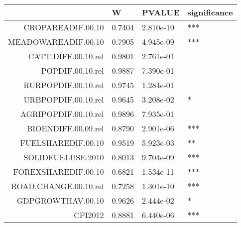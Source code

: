 \begin{table}[ht]
\centering
\begin{tabular}{rlll}
  \hline
 & W & PVALUE & significance \\ 
  \hline
CROPAREADIF.00.10 & 0.7404 & 2.810e-10 & *** \\ 
  MEADOWAREADIF.00.10 & 0.7905 & 4.945e-09 & *** \\ 
  CATT.DIFF.00.10.rel & 0.9801 & 2.761e-01 &   \\ 
  POPDIF.00.10.rel & 0.9887 & 7.390e-01 &   \\ 
  RURPOPDIF.00.10.rel & 0.9745 & 1.284e-01 &   \\ 
  URBPOPDIF.00.10.rel & 0.9645 & 3.208e-02 & * \\ 
  AGRIPOPDIF.00.10.rel & 0.9896 & 7.935e-01 &   \\ 
  BIOENDIFF.00.09.rel & 0.8790 & 2.901e-06 & *** \\ 
  FUELSHAREDIF.00.10 & 0.9519 & 5.923e-03 & ** \\ 
  SOLIDFUELUSE.2010 & 0.8013 & 9.704e-09 & *** \\ 
  FOREXSHAREDIF.00.10 & 0.6821 & 1.534e-11 & *** \\ 
  ROAD.CHANGE.00.10.rel & 0.7258 & 1.301e-10 & *** \\ 
  GDPGROWTHAV.00.10 & 0.9626 & 2.444e-02 & * \\ 
  CPI2012 & 0.8881 & 6.440e-06 & *** \\ 
   \hline
\end{tabular}
\end{table}
